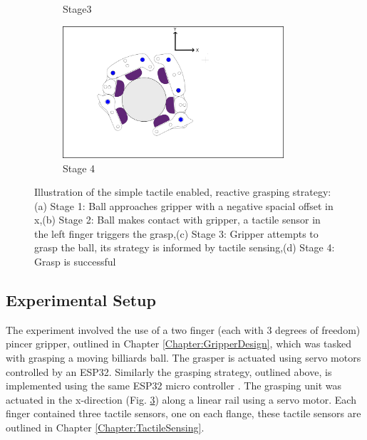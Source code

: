 \begin{figure}[ht]
\begin{subfigure}{.45\linewidth}
        \caption{Stage3}
        \label{subfigure:Stage3}
    \end{subfigure}
    \begin{subfigure}{.45\linewidth}
        \centering
    \includegraphics[width=0.9\textwidth]{Images/stage4.png}
        \caption{Stage 4}
        \label{subfigure:Stage4}
    \end{subfigure}
    \caption{Illustration of the simple tactile enabled, reactive grasping strategy: (a) Stage 1: Ball approaches gripper with a negative spacial offset in x,(b) Stage 2: Ball makes contact with gripper, a tactile sensor in the left finger triggers the grasp,(c) Stage 3: Gripper attempts to grasp the ball, its strategy is informed by tactile sensing,(d) Stage 4: Grasp is successful}
\label{fig:Tactile Stragety}
\end{figure}

\subsection{Experimental Setup}

The experiment involved the use of a two finger (each with 3 degrees of freedom) pincer gripper, outlined in Chapter \ref{Chapter:GripperDesign}, which was tasked with grasping a moving billiards ball. The grasper is actuated using servo motors controlled by an ESP32. Similarly the grasping strategy, outlined above, is implemented using the same ESP32 micro controller \cite{gitIROS}. The grasping unit was actuated in the x-direction (Fig. \ref{fig:Tactile Stragety}) along a linear rail using a servo motor. Each finger contained three tactile sensors, one on each flange, these tactile sensors are outlined in Chapter \ref{Chapter:TactileSensing}.

